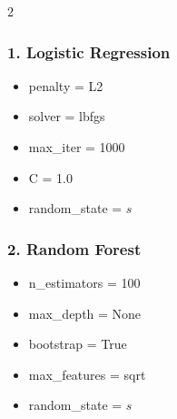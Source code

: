 \documentclass[12pt]{article}
\begin{document}
\begin{multicols}{2}
 \subsubsection*{1. Logistic Regression}
 \begin{itemize}
  \item penalty = L2
  \item solver = lbfgs
  \item max\_iter = 1000
  \item C = 1.0
  \item random\_state = $s$
 \end{itemize}

 \columnbreak

 \subsubsection*{2. Random Forest}
 \begin{itemize}
  \item n\_estimators = 100
  \item max\_depth = None
  \item bootstrap = True
  \item max\_features = sqrt
  \item random\_state = $s$
 \end{itemize}
\end{multicols}
\end{document}
